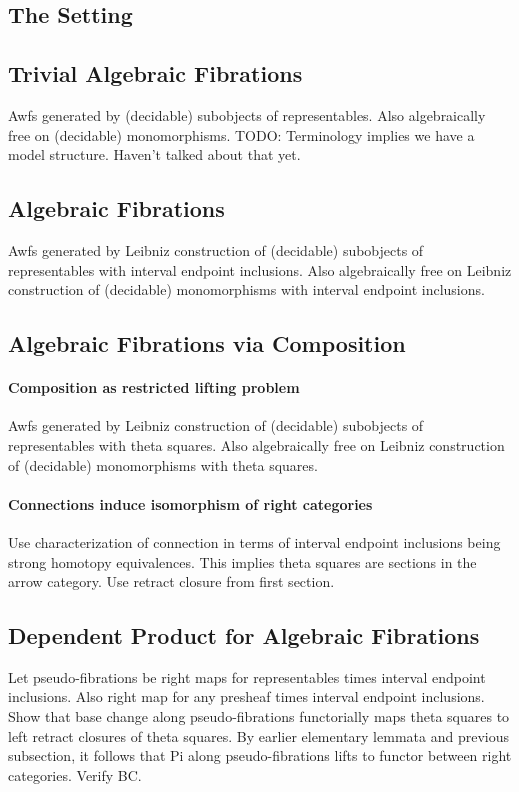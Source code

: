 \documentclass[reqno,10pt,a4paper,oneside]{amsart}
\begin{document}
\subsection{The Setting}

\subsection{Trivial Algebraic Fibrations}

Awfs generated by (decidable) subobjects of representables.
Also algebraically free on (decidable) monomorphisms.
TODO: Terminology implies we have a model structure.
Haven't talked about that yet.

\subsection{Algebraic Fibrations}

Awfs generated by Leibniz construction of (decidable) subobjects of representables with interval endpoint inclusions.
Also algebraically free on Leibniz construction of (decidable) monomorphisms with interval endpoint inclusions.

\subsection{Algebraic Fibrations via Composition}

\paragraph{Composition as restricted lifting problem}

Awfs generated by Leibniz construction of (decidable) subobjects of representables with theta squares.
Also algebraically free on Leibniz construction of (decidable) monomorphisms with theta squares.

\paragraph{Connections induce isomorphism of right categories}

Use characterization of connection in terms of interval endpoint inclusions being strong homotopy equivalences.
This implies theta squares are sections in the arrow category.
Use retract closure from first section.

\subsection{Dependent Product for Algebraic Fibrations}

Let pseudo-fibrations be right maps for representables times interval endpoint inclusions.
Also right map for any presheaf times interval endpoint inclusions.
Show that base change along pseudo-fibrations functorially maps theta squares to left retract closures of theta squares.
By earlier elementary lemmata and previous subsection, it follows that Pi along pseudo-fibrations lifts to functor between right categories.
Verify BC.



\end{document}
